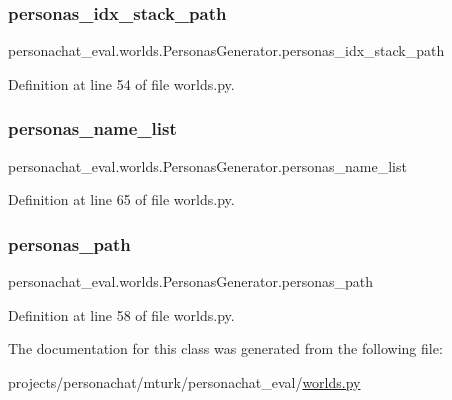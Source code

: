 \subsubsection{\texorpdfstring{personas\+\_\+idx\+\_\+stack\+\_\+path}{personas\_idx\_stack\_path}}
{\footnotesize\ttfamily personachat\+\_\+eval.\+worlds.\+Personas\+Generator.\+personas\+\_\+idx\+\_\+stack\+\_\+path}



Definition at line 54 of file worlds.\+py.

\mbox{\label{classpersonachat__eval_1_1worlds_1_1PersonasGenerator_a93f6fd5e10e1fadb6f4494d223978992}} 
\subsubsection{\texorpdfstring{personas\+\_\+name\+\_\+list}{personas\_name\_list}}
{\footnotesize\ttfamily personachat\+\_\+eval.\+worlds.\+Personas\+Generator.\+personas\+\_\+name\+\_\+list}



Definition at line 65 of file worlds.\+py.

\mbox{\label{classpersonachat__eval_1_1worlds_1_1PersonasGenerator_a8d78d1748f246ca5a3313dd0719772b2}} 
\subsubsection{\texorpdfstring{personas\+\_\+path}{personas\_path}}
{\footnotesize\ttfamily personachat\+\_\+eval.\+worlds.\+Personas\+Generator.\+personas\+\_\+path}



Definition at line 58 of file worlds.\+py.



The documentation for this class was generated from the following file\+:\begin{DoxyCompactItemize}
\item 
projects/personachat/mturk/personachat\+\_\+eval/\hyperlink{projects_2personachat_2mturk_2personachat__eval_2worlds_8py}{worlds.\+py}\end{DoxyCompactItemize}
